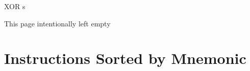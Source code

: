 \documentclass[12pt,twoside,openright,a4paper]{book}
\newcommand{\IntentionallyEmpty}{
	\mbox{}
	\vfill
	\begin{center}
	This page intentionally left empty
	\end{center}
	\vfill
	\mbox{}
}
\begin{document}
\begin{basedescript}{
	\desclabelstyle{\multilinelabel}
	\desclabelwidth{3cm}}
\begin{DetailItem}{XOR s}
		\begin{DetailEffects}[p]
			\FlagsXORr
		\end{DetailEffects}
						
		\begin{DetailTiming}
		\end{DetailTiming}

	\end{DetailItem}

\end{basedescript}


\pagebreak
\IntentionallyEmpty
\pagebreak


\appendix



\chapter{Instructions Sorted by Mnemonic}

\end{document}
